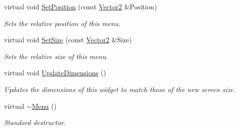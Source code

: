 \begin{DoxyCompactItemize}
virtual void \hyperlink{classMezzanine_1_1UI_1_1Menu_ab15befd0341286dd2bcfc35e2046316a}{SetPosition} (const \hyperlink{classMezzanine_1_1Vector2}{Vector2} \&Position)
\begin{DoxyCompactList}\small\item\em Sets the relative position of this menu. \item\end{DoxyCompactList}\item 
virtual void \hyperlink{classMezzanine_1_1UI_1_1Menu_ab3e0d3ea65a0bb5e19639bdd283796d0}{SetSize} (const \hyperlink{classMezzanine_1_1Vector2}{Vector2} \&Size)
\begin{DoxyCompactList}\small\item\em Sets the relative size of this menu. \item\end{DoxyCompactList}\item 
virtual void \hyperlink{classMezzanine_1_1UI_1_1Menu_a8d0e0169fb5e1c0f864670ad6d34e521}{UpdateDimensions} ()
\begin{DoxyCompactList}\small\item\em Updates the dimensions of this widget to match those of the new screen size. \item\end{DoxyCompactList}\item 
\hypertarget{classMezzanine_1_1UI_1_1Menu_aeb847e055541acb9d531391ba66b8681}{
virtual \hyperlink{classMezzanine_1_1UI_1_1Menu_aeb847e055541acb9d531391ba66b8681}{$\sim$Menu} ()}
\label{classMezzanine_1_1UI_1_1Menu_aeb847e055541acb9d531391ba66b8681}

\begin{DoxyCompactList}\small\item\em Standard destructor. \item\end{DoxyCompactList}\end{DoxyCompactItemize}
